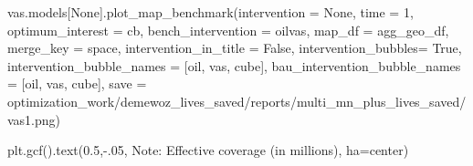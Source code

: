 \documentclass[
]{article}
\newenvironment{Shaded}{}{}
\newcommand{\DecValTok}[1]{\textcolor[rgb]{0.25,0.63,0.44}{#1}}
\newcommand{\FloatTok}[1]{\textcolor[rgb]{0.25,0.63,0.44}{#1}}
\newcommand{\NormalTok}[1]{#1}
\newcommand{\OperatorTok}[1]{\textcolor[rgb]{0.40,0.40,0.40}{#1}}
\newcommand{\StringTok}[1]{\textcolor[rgb]{0.25,0.44,0.63}{#1}}
\newcommand{\VariableTok}[1]{\textcolor[rgb]{0.10,0.09,0.49}{#1}}
\begin{document}
\begin{Shaded}
\begin{Highlighting}[numbers=left,,firstnumber=152,]
\NormalTok{vas.models[}\VariableTok{None}\NormalTok{].plot\_map\_benchmark(intervention }\OperatorTok{=} \VariableTok{None}\NormalTok{, }
\NormalTok{time }\OperatorTok{=} \DecValTok{1}\NormalTok{, }
\NormalTok{optimum\_interest }\OperatorTok{=} \StringTok{\textquotesingle{}cb\textquotesingle{}}\NormalTok{,        }
\NormalTok{bench\_intervention }\OperatorTok{=} \StringTok{\textquotesingle{}oilvas\textquotesingle{}}\NormalTok{,}
\NormalTok{map\_df }\OperatorTok{=}\NormalTok{ agg\_geo\_df,}
\NormalTok{merge\_key }\OperatorTok{=} \StringTok{\textquotesingle{}space\textquotesingle{}}\NormalTok{,}
\NormalTok{intervention\_in\_title }\OperatorTok{=} \VariableTok{False}\NormalTok{,}
\NormalTok{intervention\_bubbles}\OperatorTok{=} \VariableTok{True}\NormalTok{,}
\NormalTok{intervention\_bubble\_names }\OperatorTok{=}\NormalTok{ [}\StringTok{\textquotesingle{}oil\textquotesingle{}}\NormalTok{, }\StringTok{\textquotesingle{}vas\textquotesingle{}}\NormalTok{, }\StringTok{\textquotesingle{}cube\textquotesingle{}}\NormalTok{],}
\NormalTok{bau\_intervention\_bubble\_names }\OperatorTok{=}\NormalTok{ [}\StringTok{\textquotesingle{}oil\textquotesingle{}}\NormalTok{, }\StringTok{\textquotesingle{}vas\textquotesingle{}}\NormalTok{, }\StringTok{\textquotesingle{}cube\textquotesingle{}}\NormalTok{],}
\NormalTok{save }\OperatorTok{=} \StringTok{\textquotesingle{}optimization\_work/demewoz\_lives\_saved/reports/multi\_mn\_plus\_lives\_saved/vas1.png\textquotesingle{}}\NormalTok{)}

\NormalTok{plt.gcf().text(}\FloatTok{0.5}\NormalTok{,}\OperatorTok{{-}}\FloatTok{.05}\NormalTok{, }\StringTok{\textquotesingle{}Note: Effective coverage (in millions)\textquotesingle{}}\NormalTok{, ha}\OperatorTok{=}\StringTok{\textquotesingle{}center\textquotesingle{}}\NormalTok{)}


\end{Highlighting}
\end{Shaded}
\end{document}
